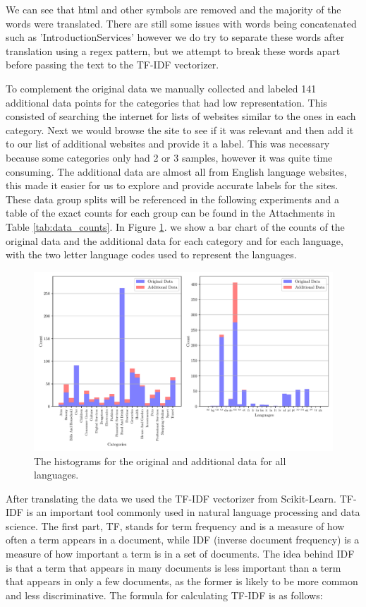 We can see that html and other symbols are removed and the majority of the words were translated. There are still some issues with words being concatenated such as 'IntroductionServices' however we do try to separate these words after translation using a regex pattern, but we attempt to break these words apart before passing the text to the TF-IDF vectorizer.

To complement the original data we manually collected and labeled 141 additional data points for the categories that had low representation. This consisted of searching the internet for lists of websites similar to the ones in each category. Next we would browse the site to see if it was relevant and then add it to our list of additional websites and provide it a label. This was necessary because some categories only had 2 or 3 samples, however it was quite time consuming. The additional data are almost all from English language websites, this made it easier for us to explore and provide accurate labels for the sites. These data group splits will be referenced in the following experiments and a table of the exact counts for each group can be found in the Attachments in Table \ref{tab:data_counts}. In Figure \ref{fig:all_hist}. we show a bar chart of the counts of the original data and the additional data for each category and for each language, with the two letter language codes used to represent the languages.

\begin{figure}[!ht]
  \centering
  \includegraphics[width=\textwidth]{../img/plot_all_hist.pdf}
  \caption{The histograms for the original and additional data for all languages.}
  \label{fig:all_hist}
\end{figure}


After translating the data we used the TF-IDF vectorizer from Scikit-Learn. TF-IDF is an important tool commonly used in natural language processing and data science. The first part, TF, stands for term frequency and is a measure of how often a term appears in a document, while IDF (inverse document frequency) is a measure of how important a term is in a set of documents. The idea behind IDF is that a term that appears in many documents is less important than a term that appears in only a few documents, as the former is likely to be more common and less discriminative. The formula for calculating TF-IDF is as follows:

